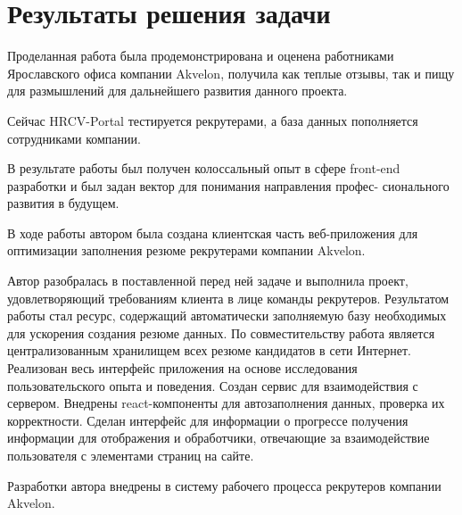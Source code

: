 \documentclass[12pt, a4paper]{diplom}
\begin{document}
\chapter{Результаты решения задачи}

Проделанная работа была продемонстрирована и оценена работниками Ярославского офиса компании Akvelon, получила как теплые 
отзывы, так и пищу для размышлений для дальнейшего развития данного проекта.

Сейчас HRCV-Portal тестируется рекрутерами, а база данных пополняется сотрудниками компании.

В результате работы был получен 
колоссальный опыт в сфере front-end 
разработки и был задан вектор для
понимания направления профес-
сионального развития в будущем.


В ходе работы автором была создана клиентская часть веб-приложения для оптимизации заполнения резюме рекрутерами компании Akvelon.

Автор разобралась в поставленной перед ней задаче и выполнила проект, удовлетворяющий требованиям клиента в лице команды рекрутеров.
Результатом работы стал ресурс, содержащий автоматически заполняемую базу необходимых для ускорения создания резюме данных.
По совместительству работа является централизованным хранилищем всех резюме кандидатов в сети Интернет. 
Реализован весь интерфейс приложения на основе исследования пользовательского опыта и поведения. Создан сервис для взаимодействия с сервером.
Внедрены react-компоненты для автозаполнения данных, проверка их корректности. Сделан интерфейс для информации о прогрессе получения информации для отображения и обработчики, отвечающие за взаимодействие пользователя с элементами страниц на сайте. 

Разработки автора внедрены в систему рабочего процесса рекрутеров компании Akvelon. 
\end{document}

